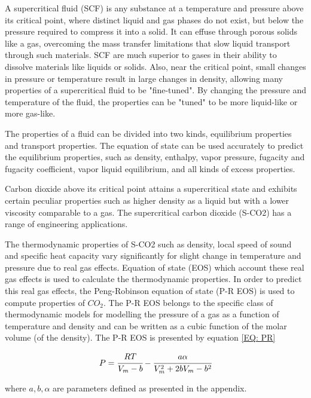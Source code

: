 \documentclass[../Article_Model_Parameters.tex]{subfiles}
\begin{document}
    A supercritical fluid (SCF) is any substance at a temperature and pressure above its critical point, where distinct liquid and gas phases do not exist, but below the pressure required to compress it into a solid. It can effuse through porous solids like a gas, overcoming the mass transfer limitations that slow liquid transport through such materials. SCF are much superior to gases in their ability to dissolve materials like liquids or solids. Also, near the critical point, small changes in pressure or temperature result in large changes in density, allowing many properties of a supercritical fluid to be "fine-tuned". By changing the pressure and temperature of the fluid, the properties can be "tuned" to be more liquid-like or more gas-like. 

    The properties of a fluid can be divided into two kinds, equilibrium properties and transport properties. The equation of state can be used accurately to predict the equilibrium properties, such as density, enthalpy, vapor pressure, fugacity and fugacity coefficient, vapor liquid equilibrium, and all kinds of excess properties.

    Carbon dioxide above its critical point attains a supercritical state and exhibits certain peculiar properties such as higher density as a liquid but with a lower viscosity comparable to a gas. The supercritical carbon dioxide (S-CO2) has a range of engineering applications. 
    
    The thermodynamic properties of S-CO2 such as density, local speed of sound and specific heat capacity vary significantly for slight change in temperature and pressure due to real gas effects. Equation of state (EOS) which account these real gas effects is used to calculate the thermodynamic properties. In order to predict this real gas effects, the Peng-Robinson equation of state (P-R EOS) is used to compute properties of $CO_2$. The P-R EOS belongs to the specific class of thermodynamic models for modelling the pressure of a gas as a function of temperature and density and can be written as a cubic function of the molar volume (of the density). The P-R EOS is presented by equation \ref{EQ: PR}

    {\footnotesize
        \begin{equation}
            P = \cfrac{RT}{V_m - b} - \cfrac{a\alpha}{V_m^2 + 2bV_m - b^2}
            \label{EQ: PR}
        \end{equation}
    }

    where $a, b, \alpha$ are parameters defined as presented in the appendix.
    
\end{document}
